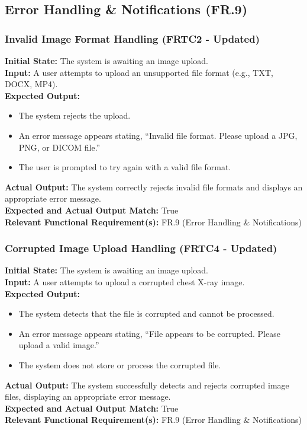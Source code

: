 \documentclass[12pt, titlepage]{article}
\begin{document}
\subsection{Error Handling \& Notifications (FR.9)}
\subsubsection{Invalid Image Format Handling (FRTC2 - Updated)}
\textbf{Initial State:} The system is awaiting an image upload.\\
\textbf{Input:} A user attempts to upload an unsupported file format (e.g., TXT, DOCX, MP4).\\
\textbf{Expected Output:}
\begin{itemize}
\item The system rejects the upload.
\item An error message appears stating, “Invalid file format. Please upload a JPG, PNG, or DICOM file.”
\item The user is prompted to try again with a valid file format.
\end{itemize}
\textbf{Actual Output:} The system correctly rejects invalid file formats and displays an appropriate error message.\\
\textbf{Expected and Actual Output Match:} True\\
\textbf{Relevant Functional Requirement(s):} FR.9 (Error Handling \& Notifications)

\subsubsection{Corrupted Image Upload Handling (FRTC4 - Updated)}
\textbf{Initial State:} The system is awaiting an image upload.\\
\textbf{Input:} A user attempts to upload a corrupted chest X-ray image.\\
\textbf{Expected Output:}
\begin{itemize}
\item The system detects that the file is corrupted and cannot be processed.
\item An error message appears stating, “File appears to be corrupted. Please upload a valid image.”
\item The system does not store or process the corrupted file.
\end{itemize}
\textbf{Actual Output:} The system successfully detects and rejects corrupted image files, displaying an appropriate error message.\\
\textbf{Expected and Actual Output Match:} True\\
\textbf{Relevant Functional Requirement(s):} FR.9 (Error Handling \& Notifications)
\end{document}
